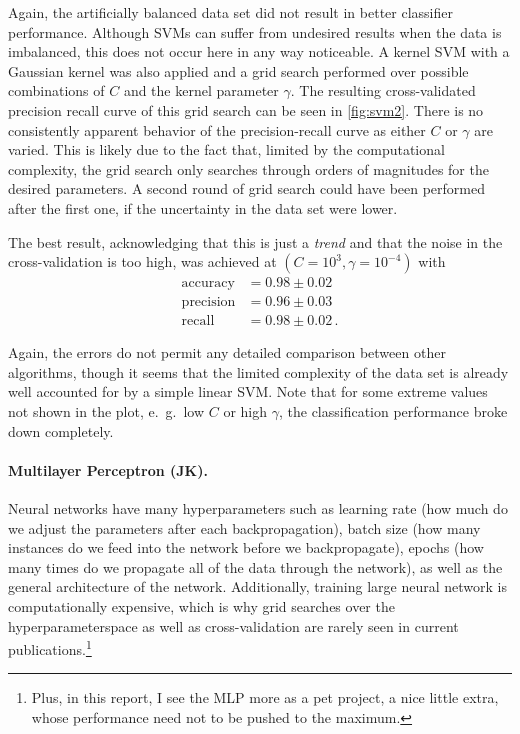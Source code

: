 \documentclass[12pt, a4paper]{scrartcl}
\begin{document}
Again, the artificially balanced data set did not result in better classifier performance. Although SVMs can suffer from undesired results when the data is imbalanced, this does not occur here in any way noticeable.
A kernel SVM with a Gaussian kernel was also applied and a grid search performed over possible combinations of $C$ and the kernel parameter $\gamma$.
The resulting cross-validated precision recall curve of this grid search can be seen in \cref{fig:svm2}.
There is no consistently apparent behavior of the precision-recall curve as either $C$ or $\gamma$ are varied. This is likely due to the fact that, limited by the computational complexity, the grid search only searches through orders of magnitudes for the desired parameters. A second round of grid search could have been performed after the first one, if the uncertainty in the data set were lower.

The best result, acknowledging that this is just a \emph{trend} and that the noise in the cross-validation is too high, was achieved at $(C=10^3, \gamma=10^{-4})$ with
\begin{align*}
	\text{accuracy} &= 0.98 \pm 0.02 \\
	\text{precision} &= 0.96 \pm 0.03 \\
	\text{recall} &= 0.98 \pm 0.02 \, .
\end{align*}

Again, the errors do not permit any detailed comparison between other algorithms, though it seems that the limited complexity of the data set is already well accounted for by a simple linear SVM. Note that for some extreme values not shown in the plot, e.\ g.\ low $C$ or high $\gamma$, the classification performance broke down completely.

\paragraph{Multilayer Perceptron (JK).} Neural networks have many hyperparameters such as learning rate (how much do we adjust the parameters after each backpropagation), batch size (how many instances do we feed into the network before we backpropagate), epochs (how many times do we propagate all of the data through the network), as well as the general architecture of the network. Additionally, training large neural network is computationally expensive, which is why grid searches over the hyperparameterspace as well as cross-validation are rarely seen in current publications.\footnote{Plus, in this report, I see the MLP more as a pet project, a nice little extra, whose performance need not to be pushed to the maximum.}
\end{document}
